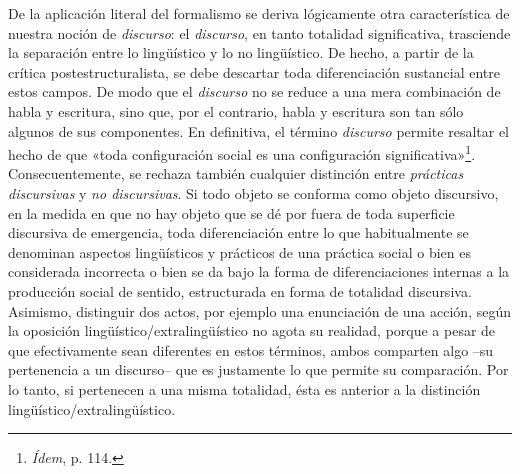 De la aplicación literal del formalismo se deriva lógicamente otra característica de nuestra noción de \emph{discurso}: el \emph{discurso}, en tanto totalidad significativa, trasciende la separación entre lo lingüístico y lo no lingüístico. De hecho, a partir de la crítica postestructuralista, se debe descartar toda diferenciación sustancial entre estos campos. De modo que el \emph{discurso} no se reduce a una mera combinación de habla y escritura, sino que, por el contrario, habla y escritura son tan sólo algunos de sus componentes. En definitiva, el término \emph{discurso} permite resaltar el hecho de que «toda configuración social es una configuración significativa»\footnote{\emph{Ídem}, p. 114.}. Consecuentemente, se rechaza también cualquier distinción entre \emph{prácticas discursivas} y \emph{no discursivas}. Si todo objeto se conforma como objeto discursivo, en la medida en que no hay objeto que se dé por fuera de toda superficie discursiva de emergencia, toda diferenciación entre lo que habitualmente se denominan aspectos lingüísticos y prácticos de una práctica social o bien es considerada incorrecta o bien se da bajo la forma de diferenciaciones internas a la producción social de sentido, estructurada en forma de totalidad discursiva. Asimismo, distinguir dos actos, por ejemplo una enunciación de una acción, según la oposición lingüístico/extralingüístico no agota su realidad, porque a pesar de que efectivamente sean diferentes en estos términos, ambos comparten algo --su pertenencia a un discurso-- que es justamente lo que permite su comparación. Por lo tanto, si pertenecen a una misma totalidad, ésta es anterior a la distinción lingüístico/extralingüístico.

